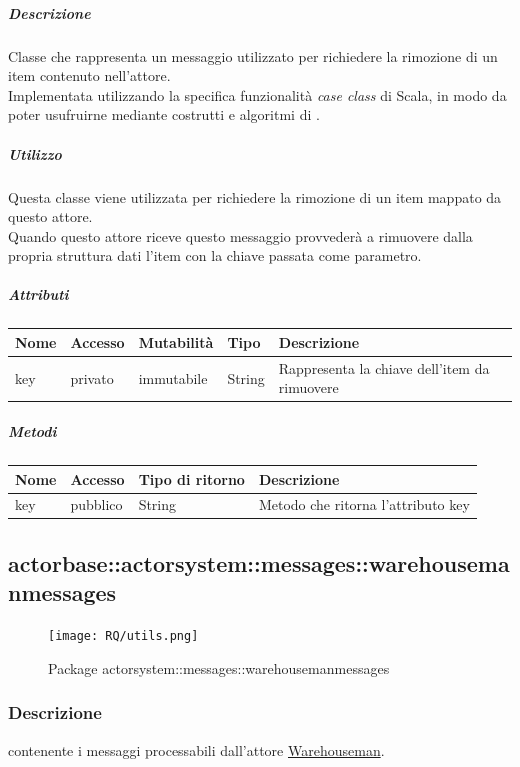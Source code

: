 \documentclass{scalatekids-article}
\begin{document}
\subparagraph{Descrizione}
Classe che rappresenta un messaggio utilizzato per richiedere la rimozione di un
item contenuto nell'attore.\\Implementata utilizzando la specifica funzionalità
\textit{case class} di Scala,
in modo da poter usufruirne mediante costrutti e algoritmi di
.

\subparagraph{Utilizzo}
Questa classe viene utilizzata per richiedere la rimozione di un
item mappato da questo attore.\\Quando questo attore riceve questo
messaggio provvederà a rimuovere dalla propria struttura dati l'item con la
chiave passata come parametro.

\subparagraph{Attributi}
\begin{tabular}{| p{2cm} | p{1.5cm} | p{2cm} | p{3cm} | p{8.5cm} |}
  \hline
  Nome & Accesso & Mutabilità & Tipo & Descrizione\\
  \hline
  key & privato & immutabile & String & Rappresenta la chiave dell'item da rimuovere\\
  \hline
\end{tabular}

\subparagraph{Metodi}
\begin{tabular}{| l | l | l | l |}
  \hline
  Nome & Accesso & Tipo di ritorno & Descrizione\\
  \hline
  key & pubblico & String & Metodo che ritorna l'attributo key\\
  \hline
\end{tabular}


\subsection{actorbase::actorsystem::messages::warehousemanmessages}
\label{sec:actorbase::actorsystem::messages::warehousemanmessages}

\begin{figure}[H]
  \begin{center}
    \texttt{[image: RQ/utils.png]}
    \caption{Package actorsystem::messages::warehousemanmessages}
  \end{center}
\end{figure}

\subsubsection{Descrizione}
 contenente i messaggi processabili dall'attore \hyperref[sec:actorbase::actorsystem::actors::warehouseman::Warehouseman]{Warehouseman}.
\end{document}
